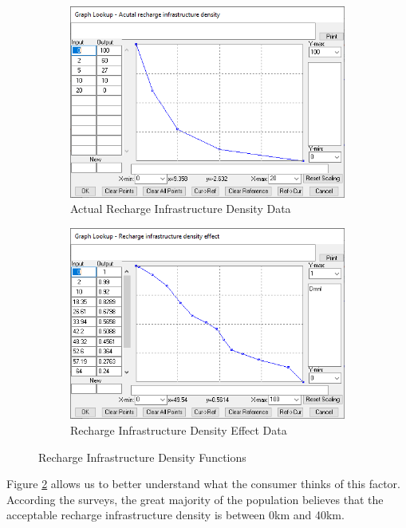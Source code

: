 \begin{figure}[htbp]
\centering
\begin{subfigure}{0.5\textwidth}
  \centering
  \includegraphics[width=0.98\linewidth]{img/recharge-infra-density.png}
  \caption{Actual Recharge Infrastructure Density Data}
  \label{fig:recharge-infra}
\end{subfigure}%
\begin{subfigure}{0.5\textwidth}
  \centering
  \includegraphics[width=0.98\linewidth]{img/recharge-infra-density-effect.png}
  \caption{Recharge Infrastructure Density Effect Data}
  \label{fig:recharge-infra-effect}
\end{subfigure}
\caption{Recharge Infrastructure Density Functions}
\label{fig:recharge-infra-funcs}
\end{figure}

Figure \ref{fig:recharge-infra-effect} allows us to better understand what the consumer thinks of this factor. According the surveys, the great majority of the population believes that the acceptable recharge infrastructure density is between 0km and 40km.

